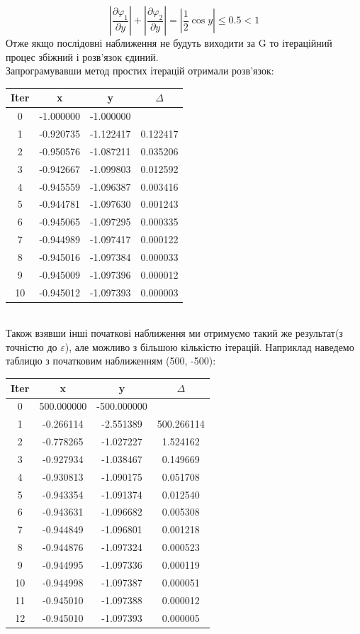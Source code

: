 \documentclass[14 pt]{extarticle}
\begin{document}
$$
\left| \frac{\partial \varphi_1}{\partial y } \right| 
+ \left| \frac{\partial \varphi_2}{\partial y } \right| 
= \left|\frac{1}{2} \cos{y}\right|\leq 0.5 < 1
$$
Отже якщо послідовні наближення не будуть виходити за G то ітераційний процес збіжний і розв'язок єдиний. \\ 
Запрограмувавши метод простих ітерацій отримали розв'язок: \\ 
\begin{tabular}{|c|c|c|c|} \hline
    Iter & x & y & $\Delta$ \\ \hline
    0 & -1.000000 & -1.000000 &   \\ \hline
    1 & -0.920735 & -1.122417 & 0.122417 \\\hline
    2 & -0.950576 & -1.087211 & 0.035206 \\\hline
    3 & -0.942667 & -1.099803 & 0.012592 \\\hline
    4 & -0.945559 & -1.096387 & 0.003416 \\\hline
    5 & -0.944781 & -1.097630 & 0.001243 \\\hline
    6 & -0.945065 & -1.097295 & 0.000335 \\\hline
    7 & -0.944989 & -1.097417 & 0.000122 \\\hline
    8 & -0.945016 & -1.097384 & 0.000033 \\\hline
    9 & -0.945009 & -1.097396 & 0.000012 \\\hline
    10 & -0.945012 & -1.097393 & 0.000003 \\\hline
    \end{tabular} \\ 
Також взявши інші початкові наближення ми отримуємо такий же результат(з точністю до $\varepsilon$),
але можливо з більшою кількістю ітерацій. Наприклад наведемо таблицю з початковим наближенням (500, -500): \\ 
\begin{tabular}{|c|c|c|c|}\hline
   Iter & x & y & $\Delta$ \\\hline
   0 & 500.000000 & -500.000000 &   \\\hline
   1 & -0.266114 & -2.551389 & 500.266114 \\\hline
   2 & -0.778265 & -1.027227 & 1.524162 \\\hline
   3 & -0.927934 & -1.038467 & 0.149669 \\\hline
   4 & -0.930813 & -1.090175 & 0.051708 \\\hline
   5 & -0.943354 & -1.091374 & 0.012540 \\\hline
   6 & -0.943631 & -1.096682 & 0.005308 \\\hline
   7 & -0.944849 & -1.096801 & 0.001218 \\\hline
   8 & -0.944876 & -1.097324 & 0.000523 \\\hline
   9 & -0.944995 & -1.097336 & 0.000119 \\\hline
   10 & -0.944998 & -1.097387 & 0.000051 \\\hline
   11 & -0.945010 & -1.097388 & 0.000012 \\\hline
   12 & -0.945010 & -1.097393 & 0.000005 \\\hline
   \end{tabular}\\ 
\end{document}
